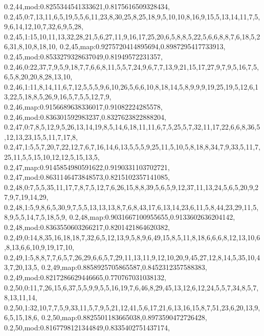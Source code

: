 0.2,44,mod:0.8255344541333621,0.8175616509328434,
0.2,45,0:7,13,11,6,5,19,5,5,6,11,23,8,30,25,8,25,18,9,5,10,10,8,16,9,15,5,13,14,11,7,5,9,6,14,12,10,7,32,6,9,5,28,
0.2,45,1:15,10,11,13,32,28,21,5,6,27,11,9,16,17,25,20,6,5,8,8,5,22,5,6,6,8,8,7,6,18,5,26,31,8,10,8,18,10,
0.2,45,map:0.9275720414895694,0.8987295417733913,
0.2,45,mod:0.8533279328637049,0.81949572231357,
0.2,46,0:22,37,7,9,5,9,18,7,7,6,6,8,11,5,5,7,24,9,6,7,7,13,9,21,15,17,27,9,7,9,5,16,7,5,6,5,8,20,20,8,28,13,10,
0.2,46,1:11,8,14,11,6,7,12,5,5,5,9,6,10,26,5,6,6,10,8,18,14,5,8,9,9,9,19,25,19,5,12,6,13,22,5,18,8,5,26,9,16,5,7,5,5,12,7,9,
0.2,46,map:0.9156689638336017,0.91082224285578,
0.2,46,mod:0.836301592983237,0.8327623822888204,
0.2,47,0:7,8,5,12,9,5,26,13,14,19,8,5,14,6,18,11,11,6,7,5,25,5,7,32,11,17,22,6,6,8,36,5,12,13,23,15,5,11,7,17,8,
0.2,47,1:5,5,7,20,7,22,12,7,6,7,16,14,6,13,5,5,5,9,25,11,5,10,5,8,18,8,34,7,9,33,5,11,7,25,11,5,5,15,10,12,12,5,15,13,5,
0.2,47,map:0.9145854980591622,0.9190331103702721,
0.2,47,mod:0.8631146473848573,0.8215102357141085,
0.2,48,0:7,5,5,35,11,17,7,8,7,5,12,7,6,26,15,8,8,39,5,6,5,9,12,37,11,13,24,5,6,5,20,9,27,9,7,19,14,29,
0.2,48,1:5,9,8,6,5,30,9,7,5,5,13,13,13,8,7,6,8,43,17,6,13,14,23,6,11,5,8,44,23,29,11,5,8,9,5,5,14,7,5,18,5,9,
0.2,48,map:0.9031667100955655,0.9133602636204142,
0.2,48,mod:0.8363550603266217,0.8201421864620382,
0.2,49,0:14,8,35,16,18,18,7,32,6,5,12,13,9,5,8,9,6,49,15,8,5,11,8,18,6,6,6,8,12,13,10,6,8,13,6,6,10,9,19,17,10,
0.2,49,1:5,8,8,7,7,6,5,7,26,29,6,6,5,7,29,11,13,11,9,12,10,20,9,45,27,12,8,14,5,35,10,43,7,20,13,5,
0.2,49,map:0.8858925705865587,0.8452312357588383,
0.2,49,mod:0.8217286629446665,0.770767031038132,
0.2,50,0:11,7,26,15,6,37,5,5,9,9,5,5,16,19,7,6,46,8,29,45,13,12,6,12,24,5,5,7,34,8,5,7,8,13,11,14,
0.2,50,1:32,10,7,7,5,9,33,11,5,7,9,5,21,12,41,5,6,17,21,6,13,16,15,8,7,51,23,6,20,13,9,6,5,15,18,6,
0.2,50,map:0.8825501183665038,0.8973590472726428,
0.2,50,mod:0.8167798121344849,0.8335402751437174,
